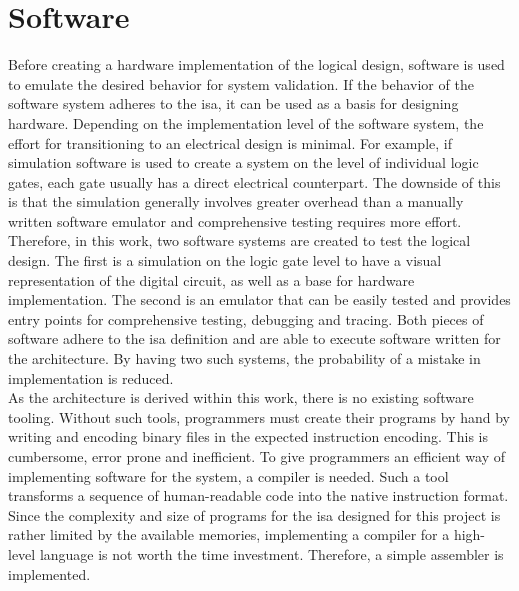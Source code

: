 \section{Software}

Before creating a hardware implementation of the logical design, software is used to emulate the desired behavior for system validation. If the behavior of the software system adheres to the \ac{isa}, it can be used as a basis for designing hardware. Depending on the implementation level of the software system, the effort for transitioning to an electrical design is minimal. For example, if simulation software is used to create a system on the level of individual logic gates, each gate usually has a direct electrical counterpart. The downside of this is that the simulation generally involves greater overhead than a manually written software emulator and comprehensive testing requires more effort. Therefore, in this work, two software systems are created to test the logical design. The first is a simulation on the logic gate level to have a visual representation of the digital circuit, as well as a base for hardware implementation. The second is an emulator that can be easily tested and provides entry points for comprehensive testing, debugging and tracing. Both pieces of software adhere to the \ac{isa} definition and are able to execute software written for the architecture. By having two such systems, the probability of a mistake in implementation is reduced.
\\

As the architecture is derived within this work, there is no existing software tooling. Without such tools, programmers must create their programs by hand by writing and encoding binary files in the expected instruction encoding. This is cumbersome, error prone and inefficient. To give programmers an efficient way of implementing software for the system, a compiler is needed. Such a tool transforms a sequence of human-readable code into the native instruction format. Since the complexity and size of programs for the \ac{isa} designed for this project is rather limited by the available memories, implementing a compiler for a high-level language is not worth the time investment. Therefore, a simple assembler is implemented.





